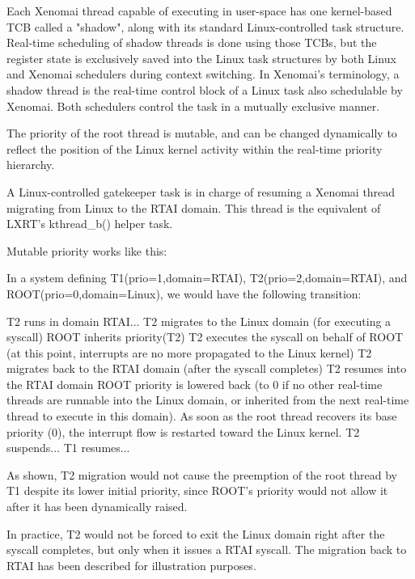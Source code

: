 Each Xenomai thread capable of executing in user-space has one
kernel-based TCB called a "shadow", along with its standard
Linux-controlled task structure. Real-time scheduling of shadow
threads is done using those TCBs, but the register state is
exclusively saved into the Linux task structures by both Linux and
Xenomai schedulers during context switching. In Xenomai's terminology,
a shadow thread is the real-time control block of a Linux task also
schedulable by Xenomai. Both schedulers control the task in a mutually
exclusive manner.

The priority of the root thread is mutable, and can be changed
dynamically to reflect the position of the Linux kernel activity
within the real-time priority hierarchy.

A Linux-controlled gatekeeper task is in charge of resuming a Xenomai
thread migrating from Linux to the RTAI domain. This thread is the
equivalent of LXRT's kthread\_b() helper task.

Mutable priority works like this:

In a system defining T1(prio=1,domain=RTAI), T2(prio=2,domain=RTAI),
and ROOT(prio=0,domain=Linux), we would have the following transition:

\begin{code}
T2 runs in domain RTAI...
   T2 migrates to the Linux domain (for executing a syscall)
       ROOT inherits priority(T2)
                T2 executes the syscall on behalf of ROOT
                (at this point, interrupts are no more propagated to
                the Linux kernel)
   T2 migrates back to the RTAI domain (after the syscall completes)
        T2 resumes into the RTAI domain
        ROOT priority is lowered back (to 0 if no other real-time
        threads are runnable into the Linux domain, or inherited from the
        next real-time thread to execute in this domain). As soon as the
        root thread recovers its base priority (0), the interrupt flow is
        restarted toward the Linux kernel.
T2 suspends...
T1 resumes...
\end{code}

As shown, T2 migration would not cause the preemption of the root
thread by T1 despite its lower initial priority, since ROOT's priority
would not allow it after it has been dynamically raised.

In practice, T2 would not be forced to exit the Linux domain right
after the syscall completes, but only when it issues a RTAI
syscall. The migration back to RTAI has been described for
illustration purposes.

